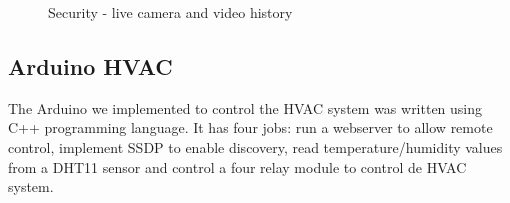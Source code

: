 \begin{figure}
\centering     %
{}
\caption{Security - live camera and video history}
\label{imp_user_camera}
\end{figure}




\subsection{Arduino HVAC}


The Arduino we implemented to control the HVAC system was written using C++ programming language. It has four jobs: run a webserver to allow remote control, implement \ac{SSDP} to enable discovery, read temperature/humidity values from a DHT11 sensor and control a four relay module to control de HVAC system.

